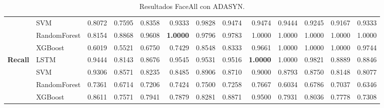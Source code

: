 \begin{table}[h]
\begin{adjustbox}{max width=15cm}
\begin{tabular}{|c|l|r|r|r|r|r|r|r|r|r|r|r|}
			& SVM &  0.8072 &  0.7595 &  0.8358 &  0.9333 &  0.9828 &  0.9474 &  0.9474 &  0.9444 &  0.9245 &  0.9167 &  0.9333 \\
			& RandomForest &  0.8154 &  0.8868 &  0.9608 &  \textbf{1.0000} &  0.9796 &  0.9783 &  1.0000 &  1.0000 &  1.0000 &  1.0000 &  1.0000 \\
			& XGBoost &  0.6019 &  0.5521 &  0.6750 &  0.7429 &  0.8548 &  0.8333 &  0.9661 &  1.0000 &  1.0000 &  1.0000 &  0.9744 \\
			\hline
			\textbf{Recall} & LSTM &  0.9444 &  0.8143 &  0.8676 &  0.9545 &  0.9531 &  0.9516 &  \textbf{1.0000} &  1.0000 &  0.9821 &  0.8889 &  0.8846 \\
			& SVM &  0.9306 &  0.8571 &  0.8235 &  0.8485 &  0.8906 &  0.8710 &  0.9000 &  0.8793 &  0.8750 &  0.8148 &  0.8077 \\
			& RandomForest &  0.7361 &  0.6714 &  0.7206 &  0.7424 &  0.7500 &  0.7258 &  0.7667 &  0.6034 &  0.6786 &  0.7037 &  0.6346 \\
			& XGBoost &  0.8611 &  0.7571 &  0.7941 &  0.7879 &  0.8281 &  0.8871 &  0.9500 &  0.7931 &  0.8036 &  0.7778 &  0.7308 \\
			\hline
		\end{tabular}
	\end{adjustbox}	
	\caption{Resultados FaceAll con ADASYN.}
	\label{tab:faceAllADASYN}
\end{table}

